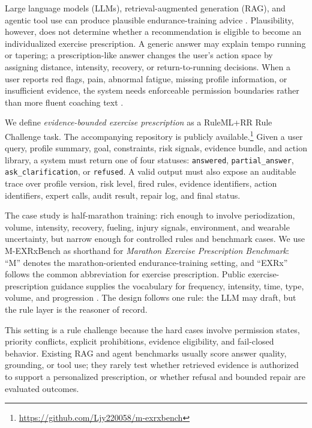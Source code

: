 \documentclass{ceurart}
\begin{document}
Large language models (LLMs), retrieval-augmented generation (RAG), and agentic tool use can produce plausible endurance-training advice \cite{lewis2020rag,yao2023react,schick2023toolformer}. Plausibility, however, does not determine whether a recommendation is eligible to become an individualized exercise prescription. A generic answer may explain tempo running or tapering; a prescription-like answer changes the user's action space by assigning distance, intensity, recovery, or return-to-running decisions. When a user reports red flags, pain, abnormal fatigue, missing profile information, or insufficient evidence, the system needs enforceable permission boundaries rather than more fluent coaching text \cite{sutton2020cdss}.

We define \emph{evidence-bounded exercise prescription} as a RuleML+RR Rule Challenge task. The accompanying repository is publicly available.\footnote{\url{https://github.com/Ljy220058/m-exrxbench}} Given a user query, profile summary, goal, constraints, risk signals, evidence bundle, and action library, a system must return one of four statuses: \texttt{answered}, \texttt{partial\_answer}, \texttt{ask\_clarification}, or \texttt{refused}. A valid output must also expose an auditable trace over profile version, risk level, fired rules, evidence identifiers, action identifiers, expert calls, audit result, repair log, and final status.

The case study is half-marathon training: rich enough to involve periodization, volume, intensity, recovery, fueling, injury signals, environment, and wearable uncertainty, but narrow enough for controlled rules and benchmark cases. We use M-EXRxBench as shorthand for \emph{Marathon Exercise Prescription Benchmark}: ``M'' denotes the marathon-oriented endurance-training setting, and ``EXRx'' follows the common abbreviation for exercise prescription. Public exercise-prescription guidance supplies the vocabulary for frequency, intensity, time, type, volume, and progression \cite{garber2011exercise,acsm2021guidelines,who2020physicalactivity}. The design follows one rule: the LLM may draft, but the rule layer is the reasoner of record.

This setting is a rule challenge because the hard cases involve permission states, priority conflicts, explicit prohibitions, evidence eligibility, and fail-closed behavior. Existing RAG and agent benchmarks usually score answer quality, grounding, or tool use; they rarely test whether retrieved evidence is authorized to support a personalized prescription, or whether refusal and bounded repair are evaluated outcomes.
\end{document}
